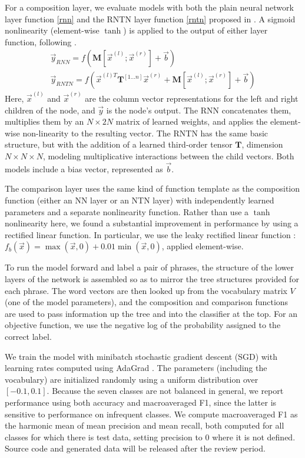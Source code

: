 For a composition layer, we evaluate models with both the plain neural
network layer function \eqref{rnn} and the RNTN layer function
\eqref{rntn} proposed in \citet{chen2013learning}. A sigmoid
nonlinearity (element-wise $\tanh$) is applied to the output of either
layer function, following \cite{socher2013acl1}.
%
\begin{gather} \label{rnn}
\vec{y}_{\textit{RNN}} = f(\mathbf{M} [\vec{x}^{(l)}; \vec{x}^{(r)}] + \vec{b}) \\ %
\label{rntn}
\vec{y}_{\textit{RNTN}} = f(\vec{x}^{(l)T} \mathbf{T}^{[1 \ldots n]} \vec{x}^{(r)} + \mathbf{M} [\vec{x}^{(l)}; \vec{x}^{(r)}] + \vec{b})
\end{gather} 
%
Here, $\vec{x}^{(l)}$ and $\vec{x}^{(r)}$ are the column vector
representations for the left and right children of the node, and
$\vec{y}$ is the node's output.  The RNN concatenates them, multiplies
them by an $N \times 2N$ matrix of learned weights, and applies the
element-wise non-linearity to the resulting vector. The RNTN has the
same basic structure, but with the addition of a learned third-order
tensor $\mathbf{T}$, dimension $N \times N \times N$, modeling
multiplicative interactions between the child vectors. Both models
include a bias vector, represented as $\vec{b}$.

The comparison layer uses the same kind of function template as the
composition function (either an NN layer or an NTN layer) with
independently learned parameters and a separate nonlinearity function.
Rather than use a $\tanh$ nonlinearity here, we found a substantial
improvement in performance by using a rectified linear function. In
particular, we use the leaky rectified linear function
\cite{maasrectifier}: $f_{b}(\vec{x})=\max(\vec{x}, 0) +
0.01\min(\vec{x}, 0)$, applied element-wise.

To run the model forward and label a pair of phrases, the structure of
the lower layers of the network is assembled so as to mirror the tree
structures provided for each phrase. The word vectors are then looked
up from the vocabulary matrix $V$ (one of the model parameters), and
the composition and comparison functions are used to pass information
up the tree and into the classifier at the top. For an objective
function, we use the negative log of the probability assigned to the
correct label.

We train the model with minibatch stochastic gradient descent (SGD)
with learning rates computed using AdaGrad \cite{duchi2011adaptive}.
The parameters (including the vocabulary) are initialized randomly 
using a uniform distribution over $[-0.1, 0.1]$.
Because the seven classes are not balanced in general, we report performance
using both accuracy and macroaveraged F1, since the latter is sensitive
to performance on infrequent classes. We compute macroaveraged F1 
as the harmonic mean of mean precision and mean recall, both computed
for all classes for which there is test data, setting precision to 0 
where it is not defined. Source code and generated data will be released
after the review period.

